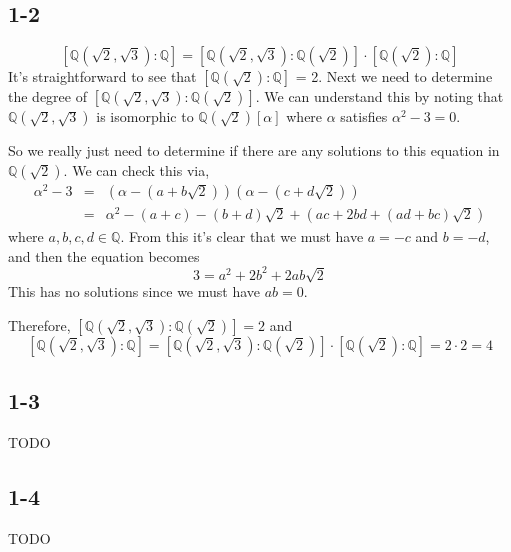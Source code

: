 \documentclass{article}
\begin{document}
\subsection{1-2}
\begin{equation}
\left[\mathbb{Q}(\sqrt{2}, \sqrt{3}) : \mathbb{Q}\right] = \left[\mathbb{Q}(\sqrt{2}, \sqrt{3}) : \mathbb{Q}(\sqrt{2})\right] \cdot \left[\mathbb{Q}(\sqrt{2}) : \mathbb{Q} \right]
\end{equation}
It's straightforward to see that $ \left[\mathbb{Q}(\sqrt{2}) : \mathbb{Q} \right] $ = 2. Next we need to determine the degree of $ \left[\mathbb{Q}(\sqrt{2}, \sqrt{3}) : \mathbb{Q}(\sqrt{2})\right] $. We can understand this by noting that $ \mathbb{Q}(\sqrt{2}, \sqrt{3}) $ is isomorphic to $ \mathbb{Q}(\sqrt{2})\left[\alpha\right] $ where $ \alpha $ satisfies $ \alpha^{2} - 3 = 0 $.

So we really just need to determine if there are any solutions to this equation in $ \mathbb{Q}(\sqrt{2}) $. We can check this via,
\begin{subequations}
\begin{align}
\alpha^{2} - 3 & = & (\alpha - (a + b\sqrt{2}))(\alpha - (c + d\sqrt{2})) \\
& = & \alpha^{2} - (a+c) - (b+d)\sqrt{2} + (ac + 2bd + (ad + bc)\sqrt{2})
\end{align}
\end{subequations}
where $a, b, c, d \in \mathbb{Q} $.
From this it's clear that we must have $ a = -c $ and $ b = -d $, and then the equation becomes
\begin{equation}
3 = a^{2} + 2b^{2} + 2ab\sqrt{2}
\end{equation}
This has no solutions since we must have $ ab = 0 $.

Therefore, $ \left[\mathbb{Q}(\sqrt{2}, \sqrt{3}) : \mathbb{Q}(\sqrt{2})\right] = 2 $ and
\begin{equation}
\left[\mathbb{Q}(\sqrt{2}, \sqrt{3}) : \mathbb{Q}\right] = \left[\mathbb{Q}(\sqrt{2}, \sqrt{3}) : \mathbb{Q}(\sqrt{2})\right] \cdot \left[\mathbb{Q}(\sqrt{2}) : \mathbb{Q} \right] = 2 \cdot 2 = 4
\end{equation}

\subsection{1-3}
TODO

\subsection{1-4}
TODO
\end{document}

